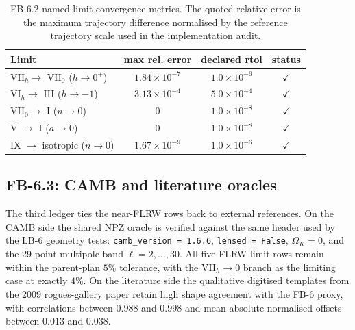 \begin{table}[t]
\caption{FB-6.2 named-limit convergence metrics.  The quoted relative
error is the maximum trajectory difference normalised by the reference
trajectory scale used in the implementation audit.}
\label{tab:fb6_limits}
\centering
\small
\begin{tabular}{lccc}
\hline\hline
Limit & max rel. error & declared rtol & status \\
\hline
VII$_h \rightarrow$ VII$_0$ ($h \rightarrow 0^+$) & $1.84\times 10^{-7}$ & $1.0\times 10^{-6}$ & $\checkmark$ \\
VI$_h \rightarrow$ III ($h \rightarrow -1$)       & $3.13\times 10^{-4}$ & $5.0\times 10^{-4}$ & $\checkmark$ \\
VII$_0 \rightarrow$ I ($n \rightarrow 0$)         & $0$                   & $1.0\times 10^{-8}$ & $\checkmark$ \\
V $\rightarrow$ I ($a \rightarrow 0$)             & $0$                   & $1.0\times 10^{-8}$ & $\checkmark$ \\
IX $\rightarrow$ isotropic ($n \rightarrow 0$)    & $1.67\times 10^{-9}$ & $1.0\times 10^{-6}$ & $\checkmark$ \\
\hline\hline
\end{tabular}
\end{table}

\subsection{FB-6.3: CAMB and literature oracles}

The third ledger ties the near-FLRW rows back to external references.
On the CAMB side the shared NPZ oracle is verified against the same
header used by the LB-6 geometry tests:
\texttt{camb\_version = 1.6.6}, \texttt{lensed = False},
$\Omega_K = 0$, and the
29-point multipole band $\ell = 2,\dots,30$.  All five FLRW-limit rows
remain within the parent-plan $5\%$ tolerance, with the
VII$_h \rightarrow 0$ branch as the limiting case at exactly $4\%$.
On the literature side the qualitative digitised templates from the
2009 rogues-gallery paper retain high shape agreement with the FB-6
proxy, with correlations between $0.988$ and $0.998$ and mean absolute
normalised offsets between $0.013$ and $0.038$.

